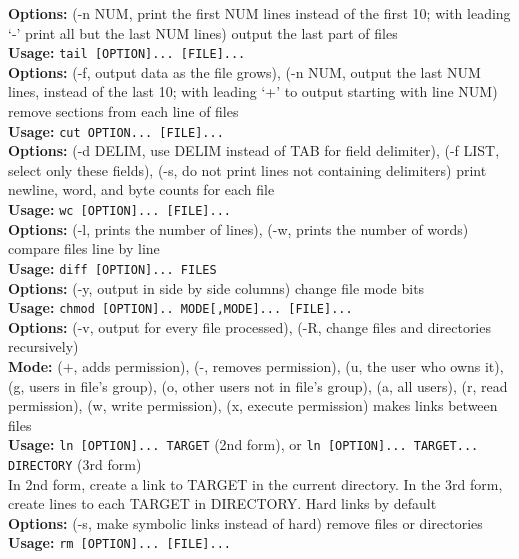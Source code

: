 \documentclass[number]{notes}
\begin{document}
\begin{landscape}
\begin{multicols}{3}
\textbf{Options:} (-n NUM, print the first NUM lines instead of the first 10; with leading `-' print all but the last NUM lines)
output the last part of files\\
\textbf{Usage:} \texttt{tail [OPTION]... [FILE]...}\\
\textbf{Options:} (-f, output data as the file grows), (-n NUM, output the last NUM lines, instead of the last 10; with leading `+' to output starting with line NUM)
remove sections from each line of files\\
\textbf{Usage:} \texttt{cut OPTION... [FILE]...}\\
\textbf{Options:} (-d DELIM, use DELIM instead of TAB for field delimiter), (-f LIST, select only these fields), (-s, do not print lines not containing delimiters)
print newline, word, and byte counts for each file\\
\textbf{Usage:} \texttt{wc [OPTION]... [FILE]...}\\
\textbf{Options:} (-l, prints the number of lines), (-w, prints the number of words)
compare files line by line\\
\textbf{Usage:} \texttt{diff [OPTION]... FILES}\\
\textbf{Options:} (-y, output in side by side columns)
change file mode bits\\
\textbf{Usage:} \texttt{chmod [OPTION].. MODE[,MODE]... [FILE]...}\\
\textbf{Options:} (-v, output for every file processed), (-R, change files and directories recursively)\\
\textbf{Mode:} (+, adds permission), (-, removes permission), (u, the user who owns it), (g, users in file's group), (o, other users not in file's group), (a, all users), (r, read permission), (w, write permission), (x, execute permission)
makes links between files\\
\textbf{Usage:} \texttt{ln [OPTION]... TARGET} (2nd form), or \texttt{ln [OPTION]... TARGET... DIRECTORY} (3rd form)\\
In 2nd form, create a link to TARGET in the current directory. In the 3rd form, create lines to each TARGET in DIRECTORY. Hard links by default\\
\textbf{Options:} (-s, make symbolic links instead of hard)
remove files or directories\\
\textbf{Usage:} \texttt{rm [OPTION]... [FILE]...}\\

\end{multicols}
\end{landscape}
\end{document}
